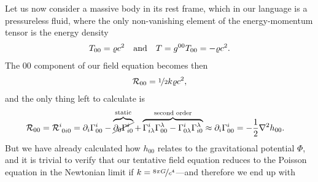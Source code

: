Let us now consider a massive body in its rest frame, which in our language is a
pressureless fluid, where the only non-vanishing element of the energy-momentum
tensor is the energy density
\begin{align*}
  T_{00} = \varrho c^2 \quad\text{and}\quad T = g^{00}T_{00} = -\varrho c^2.
\end{align*}
The $00$ component of our field equation becomes then
\begin{align*}
  \mathcal{R}_{00} = \nicefrac{1}{2}k\varrho c^2,
\end{align*}
and the only thing left to calculate is
\begin{align*}
  \ricci{00} & = \riemann{i}{0i0} =
  \derx{i}\christoffel{i}{00} -
  \overbrace{\cancel{\derx{0}\christoffel{i}{i0}}}^\text{static} +
  \overbrace{\christoffel{i}{i\lambda}\christoffel{\lambda}{00} -
  \christoffel{i}{0\lambda}\christoffel{\lambda}{i0}}^\text{second order}
  \approx \derx{i}\christoffel{i}{00} = -\frac{1}{2} \nabla^2 h_{00}.
\end{align*}
But we have already calculated how $h_{00}$ relates to the gravitational potential
$\Phi$, and it is trivial to verify that our tentative field equation reduces to
the Poisson equation in the Newtonian limit if $k = \nicefrac{8\pi G}{c^4}$---and
therefore we end up with
